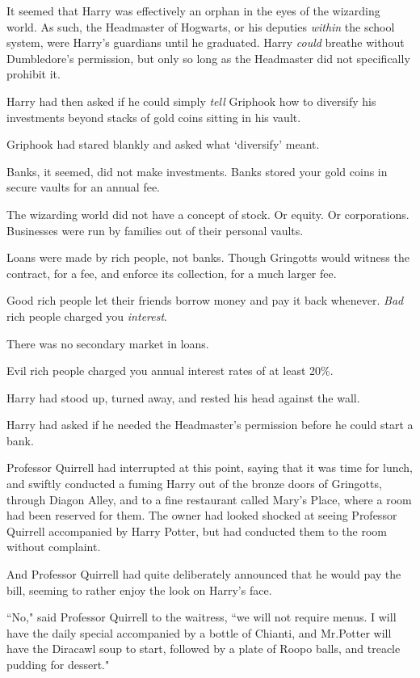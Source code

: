 It seemed that Harry was effectively an orphan in the eyes of the wizarding world. As such, the Headmaster of Hogwarts, or his deputies \emph{within} the school system, were Harry's guardians until he graduated. Harry \emph{could} breathe without Dumbledore's permission, but only so long as the Headmaster did not specifically prohibit it.

Harry had then asked if he could simply \emph{tell} Griphook how to diversify his investments beyond stacks of gold coins sitting in his vault.

Griphook had stared blankly and asked what `diversify' meant.

Banks, it seemed, did not make investments. Banks stored your gold coins in secure vaults for an annual fee.

The wizarding world did not have a concept of stock. Or equity. Or corporations. Businesses were run by families out of their personal vaults.

Loans were made by rich people, not banks. Though Gringotts would witness the contract, for a fee, and enforce its collection, for a much larger fee.

Good rich people let their friends borrow money and pay it back whenever. \emph{Bad} rich people charged you \emph{interest}.

There was no secondary market in loans.

Evil rich people charged you annual interest rates of at least 20\%.

Harry had stood up, turned away, and rested his head against the wall.

Harry had asked if he needed the Headmaster's permission before he could start a bank.

Professor Quirrell had interrupted at this point, saying that it was time for lunch, and swiftly conducted a fuming Harry out of the bronze doors of Gringotts, through Diagon Alley, and to a fine restaurant called Mary's Place, where a room had been reserved for them. The owner had looked shocked at seeing Professor Quirrell accompanied by Harry Potter, but had conducted them to the room without complaint.

And Professor Quirrell had quite deliberately announced that he would pay the bill, seeming to rather enjoy the look on Harry's face.

``No," said Professor Quirrell to the waitress, ``we will not require menus. I will have the daily special accompanied by a bottle of Chianti, and Mr.\?Potter will have the Diracawl soup to start, followed by a plate of Roopo balls, and treacle pudding for dessert."

